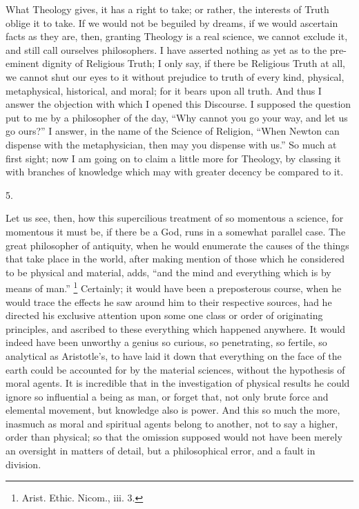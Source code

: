 What Theology gives, it has a right to take; or rather, the
interests of Truth oblige it to take. If we would not be beguiled by
dreams, if we would ascertain facts as they are, then, granting
Theology is a real science, we cannot exclude it, and still call
ourselves philosophers. I have asserted nothing as yet as to the
pre-eminent dignity of Religious Truth; I only say, if there be
Religious Truth at all, we cannot shut our eyes to it without
prejudice to truth of every kind, physical, metaphysical, historical,
and moral; for it bears upon all truth. And thus I answer the
objection with which I opened this Discourse. I supposed the question
put to me by a philosopher of the day, ``Why cannot you go your
way, and let us go ours?'' I answer, in the name of the
Science of Religion, ``When Newton can dispense with the
metaphysician, then may you dispense with us.'' So much at first
sight; now I am going on to claim a little more for Theology, by
classing it with branches of knowledge which may with greater decency
be compared to it.

5.

Let us see, then, how this supercilious treatment of so momentous a
science, for momentous it must be, if there be a God, runs in a
somewhat parallel case. The great philosopher of antiquity, when he
would enumerate the causes of the things that take place in the world,
after making mention of those which he considered to be physical and
material, adds, ``and the mind and everything which is by means of
man.'' \footnote{Arist. Ethic. Nicom., iii. 3.} Certainly; it
would have been a preposterous course, when he would trace the effects
he saw around him to their respective sources, had he directed his
exclusive attention upon some one class or order of originating
principles, and ascribed to these everything which happened anywhere.
It would indeed have been unworthy a genius so curious, so
penetrating, so fertile, so analytical as Aristotle's, to have laid it
down that everything on the face of the earth could be accounted for
by the material sciences, without the hypothesis of moral agents. It
is incredible that in the investigation of physical results he could
ignore so influential a being as man, or forget that, not only brute
force and elemental movement, but knowledge also is power. And this so
much the more, inasmuch as moral and spiritual agents belong to
another, not to say a higher, order than physical; so that the
omission supposed would not have been merely an oversight in
matters of detail, but a philosophical error, and a fault in division.

